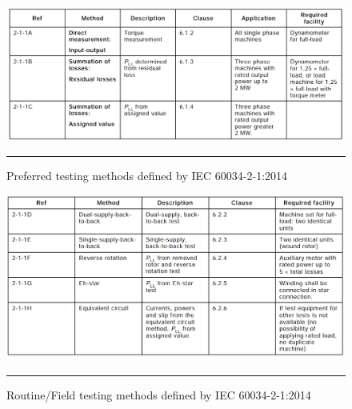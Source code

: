 \begin{figure}[htbp]
	\centering
		\includegraphics[width = 5.5in]{./Figures/MS/23.png}
		\rule{35em}{0.5pt}
	\caption{Preferred testing methods defined by IEC 60034-2-1:2014}
	\label{fig:Preferred testing methods defined by IEC 60034-2-1:2014}
\end{figure}
\begin{figure}[htbp]
	\centering
		\includegraphics[width = 5.5in]{./Figures/MS/24.png}
		\rule{35em}{0.5pt}
	\caption{Routine/Field testing methods defined by IEC 60034-2-1:2014}
	\label{fig:Routine/Field testing methods defined by IEC 60034-2-1:2014}
\end{figure}

